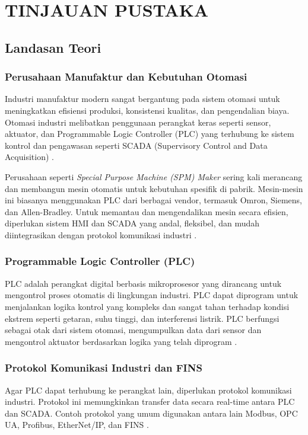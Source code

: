 \chapter{TINJAUAN PUSTAKA}

\section{Landasan Teori}

\subsection{Perusahaan Manufaktur dan Kebutuhan Otomasi}
Industri manufaktur modern sangat bergantung pada sistem otomasi untuk meningkatkan efisiensi produksi, konsistensi kualitas, dan pengendalian biaya. Otomasi industri melibatkan penggunaan perangkat keras seperti sensor, aktuator, dan Programmable Logic Controller (PLC) yang terhubung ke sistem kontrol dan pengawasan seperti SCADA (Supervisory Control and Data Acquisition) \parencite{sastoque2023assessing}.

Perusahaan seperti \textit{Special Purpose Machine (SPM) Maker} sering kali merancang dan membangun mesin otomatis untuk kebutuhan spesifik di pabrik. Mesin-mesin ini biasanya menggunakan PLC dari berbagai vendor, termasuk Omron, Siemens, dan Allen-Bradley. Untuk memantau dan mengendalikan mesin secara efisien, diperlukan sistem HMI dan SCADA yang andal, fleksibel, dan mudah diintegrasikan dengan protokol komunikasi industri \parencite{humaj2021fins}.

\subsection{Programmable Logic Controller (PLC)}
PLC adalah perangkat digital berbasis mikroprosesor yang dirancang untuk mengontrol proses otomatis di lingkungan industri. PLC dapat diprogram untuk menjalankan logika kontrol yang kompleks dan sangat tahan terhadap kondisi ekstrem seperti getaran, suhu tinggi, dan interferensi listrik. PLC berfungsi sebagai otak dari sistem otomasi, mengumpulkan data dari sensor dan mengontrol aktuator berdasarkan logika yang telah diprogram \parencite{emqx2023fins}.

\subsection{Protokol Komunikasi Industri dan FINS}
Agar PLC dapat terhubung ke perangkat lain, diperlukan protokol komunikasi industri. Protokol ini memungkinkan transfer data secara real-time antara PLC dan SCADA. Contoh protokol yang umum digunakan antara lain Modbus, OPC UA, Profibus, EtherNet/IP, dan FINS \parencite{sastoque2023assessing}.

